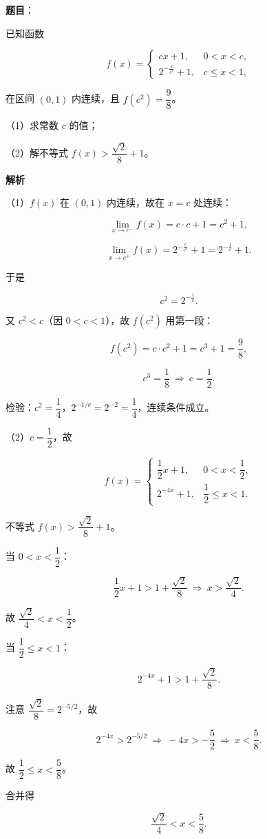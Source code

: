 \begin{answer}

\textbf{题目}：

已知函数

\nopagebreak[4]
\[f(x)=\begin{cases}cx+1,&0<x<c,\\ 2^{-\frac{x}{c^2}}+1,&c\leqslant x<1,\end{cases}\]

在区间 $(0,1)$ 内连续，且 $f(c^2)=\dfrac98$。

（1）求常数 $c$ 的值；

（2）解不等式 $f(x)>\dfrac{\sqrt2}{8}+1$。

\textbf{解析}

（1）$f(x)$ 在 $(0,1)$ 内连续，故在 $x=c$ 处连续：

\nopagebreak[4]
\[\lim_{x\to c^-}f(x)=c\cdot c+1=c^2+1,\]

\nopagebreak[4]
\[\lim_{x\to c^+}f(x)=2^{-\frac{c}{c^2}}+1=2^{-\frac1c}+1.\]

于是

\nopagebreak[4]
\[c^2=2^{-\frac1c}.\]

又 $c^2<c$（因 $0<c<1$），故 $f(c^2)$ 用第一段：

\nopagebreak[4]
\[f(c^2)=c\cdot c^2+1=c^3+1=\frac98,\]

\nopagebreak[4]
\[c^3=\frac18\ \Rightarrow\ c=\frac12.\]

检验：$c^2=\dfrac14$，$2^{-1/c}=2^{-2}=\dfrac14$，连续条件成立。

（2）$c=\dfrac12$，故

\nopagebreak[4]
\[f(x)=\begin{cases}\dfrac12x+1,&0<x<\dfrac12,\\ 2^{-4x}+1,&\dfrac12\leqslant x<1.\end{cases}\]

不等式 $f(x)>\dfrac{\sqrt2}{8}+1$。

当 $0<x<\dfrac12$：

\nopagebreak[4]
\[\frac12x+1>1+\frac{\sqrt2}{8}\ \Rightarrow\ x>\frac{\sqrt2}{4}.\]

故 $\dfrac{\sqrt2}{4}<x<\dfrac12$。

当 $\dfrac12\leqslant x<1$：

\nopagebreak[4]
\[2^{-4x}+1>1+\frac{\sqrt2}{8}.\]

注意 $\dfrac{\sqrt2}{8}=2^{-5/2}$，故

\nopagebreak[4]
\[2^{-4x}>2^{-5/2}\ \Rightarrow\ -4x>-\frac52\ \Rightarrow\ x<\frac58.\]

故 $\dfrac12\leqslant x<\dfrac58$。

合并得

\nopagebreak[4]
\[\frac{\sqrt2}{4}<x<\frac58.\]


\end{answer}
